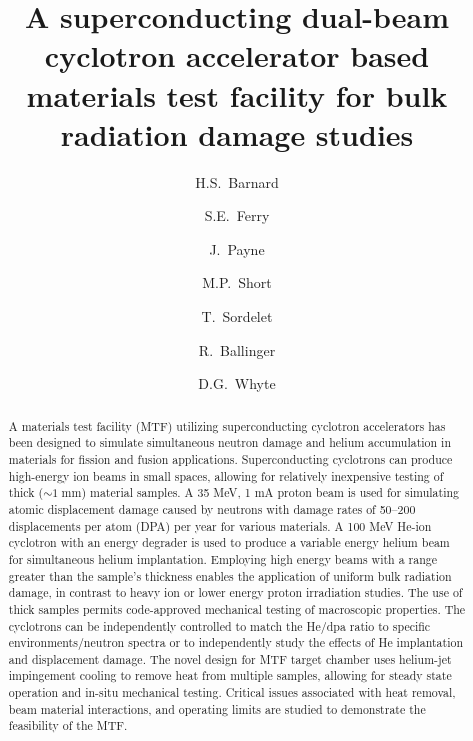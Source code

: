 \documentclass[final,3p,times,twocolumn]{elsarticle} %
\begin{document}

\begin{frontmatter}

\title{A superconducting dual-beam cyclotron accelerator based materials test facility for bulk radiation damage studies}


\author{H.S.~Barnard}
\author{S.E.~Ferry}
\author{J.~Payne}
\author{M.P.~Short}
\author{T.~Sordelet}
\author{R.~Ballinger}
\author{D.G.~Whyte}

\address{Massachusetts Institute of
  Technology, Dept. of Nuclear Science and Engineering. 
  Cambridge, Massachusetts, 02139,  USA}


\begin{abstract}

A materials test facility (MTF) utilizing superconducting cyclotron accelerators has been designed to simulate simultaneous neutron damage and helium 
accumulation in materials for fission and fusion applications.  Superconducting cyclotrons can produce high-energy ion beams in small spaces, allowing 
for relatively inexpensive testing of thick ($\sim 1\;\mathrm{mm}$) material samples.  A 35 MeV, 1 mA proton beam is used for simulating atomic 
displacement damage caused by neutrons with damage rates of 50--200 displacements per atom (DPA) per year for various materials.  A 100 MeV He-ion 
cyclotron with an energy degrader is used to produce a variable energy helium beam for simultaneous helium implantation.  Employing high energy beams 
with a range greater than the sample's thickness enables the application of uniform bulk radiation damage, in contrast to heavy ion or lower energy 
proton irradiation studies.  The use of thick samples permits code-approved mechanical testing of macroscopic properties.  The cyclotrons can be 
independently controlled to match the He/dpa ratio to specific environments/neutron spectra or to independently study the effects of He implantation 
and displacement damage.  The novel design for MTF target chamber uses helium-jet impingement cooling to remove heat from multiple samples, allowing 
for steady state operation and in-situ mechanical testing.  Critical issues associated with heat removal, beam material interactions, and operating 
limits are studied to demonstrate the feasibility of the MTF.


\end{abstract}
\end{frontmatter}
\end{document}
